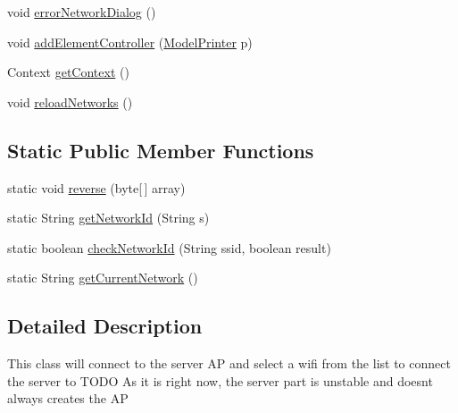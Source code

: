 \begin{DoxyCompactItemize}
\item 
void \hyperlink{classandroid_1_1app_1_1printerapp_1_1devices_1_1discovery_1_1_print_network_manager_a161c3b0a232f267bc612db8b4f3e2f38}{error\+Network\+Dialog} ()
\item 
void \hyperlink{classandroid_1_1app_1_1printerapp_1_1devices_1_1discovery_1_1_print_network_manager_a737f099ecad6b68d6bad42a7c2a5d20d}{add\+Element\+Controller} (\hyperlink{classandroid_1_1app_1_1printerapp_1_1model_1_1_model_printer}{Model\+Printer} p)
\item 
Context \hyperlink{classandroid_1_1app_1_1printerapp_1_1devices_1_1discovery_1_1_print_network_manager_ac84a4314b046fac2d5614c50a1fcb95d}{get\+Context} ()
\item 
void \hyperlink{classandroid_1_1app_1_1printerapp_1_1devices_1_1discovery_1_1_print_network_manager_acfe0da9b27ec65e3fdfd198767f47b7a}{reload\+Networks} ()
\end{DoxyCompactItemize}
\subsection*{Static Public Member Functions}
\begin{DoxyCompactItemize}
\item 
static void \hyperlink{classandroid_1_1app_1_1printerapp_1_1devices_1_1discovery_1_1_print_network_manager_a9b931b59f760cdf5e8f6260279d4796a}{reverse} (byte\mbox{[}$\,$\mbox{]} array)
\item 
static String \hyperlink{classandroid_1_1app_1_1printerapp_1_1devices_1_1discovery_1_1_print_network_manager_aed529535f7524fc494367f07ea9e99d2}{get\+Network\+Id} (String s)
\item 
static boolean \hyperlink{classandroid_1_1app_1_1printerapp_1_1devices_1_1discovery_1_1_print_network_manager_af4916f04a5130c6dbae4b591df7d2b6f}{check\+Network\+Id} (String ssid, boolean result)
\item 
static String \hyperlink{classandroid_1_1app_1_1printerapp_1_1devices_1_1discovery_1_1_print_network_manager_a98e270943d301d7daddf3205e20335d2}{get\+Current\+Network} ()
\end{DoxyCompactItemize}


\subsection{Detailed Description}
This class will connect to the server AP and select a wifi from the list to connect the server to T\+O\+DO As it is right now, the server part is unstable and doesn\textquotesingle{}t always creates the AP


